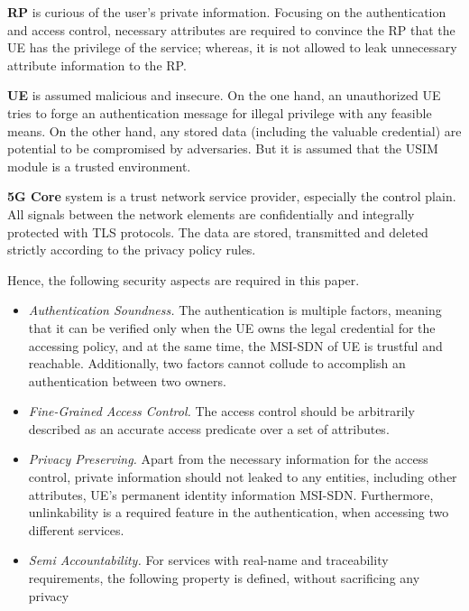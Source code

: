 \textbf{RP} is curious of the user's private information. Focusing on the authentication and access control, necessary attributes are required to convince the RP that the UE has the privilege of the service; whereas, it is not allowed to leak unnecessary attribute information to the RP. 

\textbf{UE} is assumed malicious and insecure. On the one hand, an unauthorized UE tries to forge an authentication message for illegal privilege with any feasible means. On the other hand, any stored data (including the valuable credential) are potential to be compromised by adversaries. But it is assumed that the USIM module is a trusted environment. 

\textbf{5G Core} system is a trust network service provider, especially the control plain. All signals between the network elements are confidentially and integrally protected with TLS protocols. The data are stored, transmitted and deleted strictly according to the privacy policy rules.

Hence, the following security aspects are required in this paper.

\begin{itemize}
	\item \textit{Authentication Soundness.} 
	The authentication is multiple factors, meaning that it can be verified only when the UE owns the legal credential for the accessing policy, and at the same time, the MSI-SDN of UE is trustful and reachable. Additionally, two factors cannot collude to accomplish an authentication between two owners.
	\item \textit{Fine-Grained Access Control.} The access control should be arbitrarily described as an accurate access predicate over a set of attributes.
	\item \textit{Privacy Preserving.} Apart from the necessary information for the access control, private information should not leaked to any entities, including other attributes, UE's permanent identity information MSI-SDN. Furthermore, unlinkability is a required feature in the authentication, when accessing two different services.
	\item \textit{Semi Accountability.} For services with real-name and traceability requirements, the following property is defined, without sacrificing any privacy 
\end{itemize}

